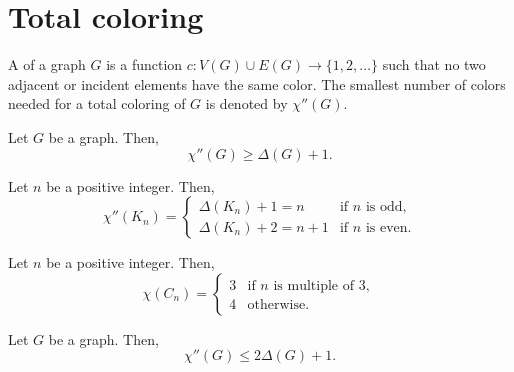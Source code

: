 \section{Total coloring}

A  of a graph \(G\) is a function
\(c \colon V(G) \cup E(G) \to \{1, 2, \ldots\}\)
such that no two adjacent or incident elements have the same color.
The smallest number of colors
needed for a total coloring of \(G\)
is denoted by \(\chi''(G)\).

\begin{proposition}
    Let \(G\) be a graph.
    Then,
    \begin{equation}
        \chi''(G) \geq \Delta(G) + 1.
    \end{equation}
\end{proposition}

\begin{proposition} \label{prop:chi''-complete}
    Let \(n\) be a positive integer.
    Then,
    \begin{equation}
        \chi''(K_n)
        =
        \begin{cases}
            \Delta(K_n) + 1 = n & \text{if } n \text{ is odd}, \\
            \Delta(K_n) + 2 = n + 1 & \text{if } n \text{ is even}.
        \end{cases}
    \end{equation}
\end{proposition}

\begin{proposition} \label{prop:chi''-cycle}
    Let \(n\) be a positive integer.
    Then,
    \begin{equation}
        \chi(C_n) =
        \begin{cases}
            3 & \text{if } n \text{ is multiple of } 3, \\
            4 & \text{otherwise}.
        \end{cases}
    \end{equation}
\end{proposition}

\begin{proposition}
    Let \(G\) be a graph.
    Then,
    \begin{equation}
        \chi''(G) \leq 2\Delta(G) + 1.
    \end{equation}
\end{proposition}

